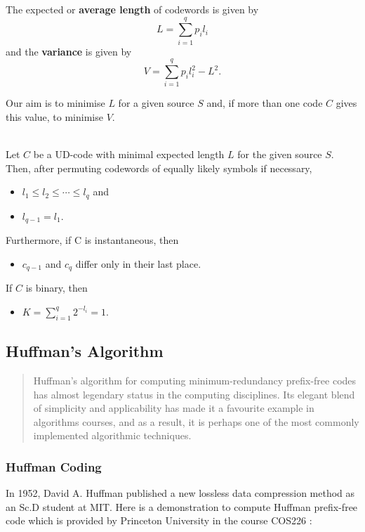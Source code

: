 \documentclass{article}
\begin{document}
The expected or \textbf{average length} of codewords is given by
    \[L=\sum_{i=1}^{q}p_{i}l_{i}\]
    and the \textbf{variance} is given by
    \[V=\sum_{i=1}^{q}p_{i}l_{i}^{2}-L^{2}.\]

Our aim is to minimise $L$ for a given source $S$ and, if more than one code $C$ gives this value, to minimise $V$.

\begin{theorem}
    \mbox{}\\
    Let $C$ be a UD-code with minimal expected length $L$ for the given source $S$. Then, after permuting codewords of equally likely symbols if necessary,
    \begin{itemize}
        \item $l_{1} \leq l_{2} \leq \cdots \leq l_{q}$ and
        \item $l_{q-1}=l_{1}$.
    \end{itemize}
    Furthermore, if C is instantaneous, then
    \begin{itemize}
        \item $c_{q-1}$ and $c_{q}$ differ only in their last place.
    \end{itemize}
    If $C$ is binary, then
    \begin{itemize}
        \item $K=\sum_{i=1}^{q}2^{-l_{i}}=1.$
    \end{itemize}
\end{theorem}

\subsection{Huffman's Algorithm}

\begin{quotation}
    Huffman’s algorithm for computing minimum-redundancy prefix-free codes has almost legendary status in the computing disciplines. Its elegant blend of simplicity and applicability has made it a favourite example in algorithms courses, and as a result, it is perhaps one of the most commonly implemented algorithmic techniques. \cite{Moffat_2019}
\end{quotation}

\subsubsection{Huffman Coding}

In 1952, David A. Huffman \cite{Huffman_1952} published a new lossless data compression method as an Sc.D student at MIT. Here is a demonstration to compute Huffman prefix-free code which is provided by Princeton University in the course COS226 \cite{princetonLec5.5}:
\end{document}
